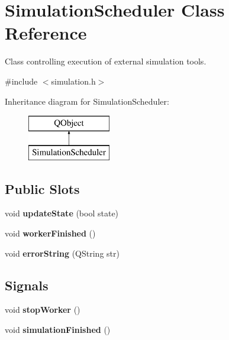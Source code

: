 \hypertarget{class_simulation_scheduler}{}\section{Simulation\+Scheduler Class Reference}
\label{class_simulation_scheduler}


Class controlling execution of external simulation tools.  




{\ttfamily \#include $<$simulation.\+h$>$}

Inheritance diagram for Simulation\+Scheduler\+:\begin{figure}[H]
\begin{center}
\leavevmode
\includegraphics[height=2.000000cm]{class_simulation_scheduler}
\end{center}
\end{figure}
\subsection*{Public Slots}
\begin{DoxyCompactItemize}
\item 
\mbox{\label{class_simulation_scheduler_ae48b5f2f68304c077d890c4dbe882e4f}} 
void {\bfseries update\+State} (bool state)
\item 
\mbox{\label{class_simulation_scheduler_a060a51e44f3f6e51b1631fc3a41194d0}} 
void {\bfseries worker\+Finished} ()
\item 
\mbox{\label{class_simulation_scheduler_a27ad04f596b98dcf32e02fe0104a062b}} 
void {\bfseries error\+String} (Q\+String str)
\end{DoxyCompactItemize}
\subsection*{Signals}
\begin{DoxyCompactItemize}
\item 
\mbox{\label{class_simulation_scheduler_a0984b261f42cb46e75c4042349922e19}} 
void {\bfseries stop\+Worker} ()
\item 
\mbox{\label{class_simulation_scheduler_a1b99e3a87e300443f93c9e5a37f81530}} 
void {\bfseries simulation\+Finished} ()
\end{DoxyCompactItemize}

